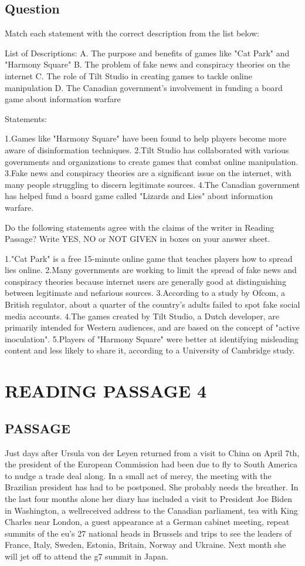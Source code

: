 \documentclass[10pt, a4paper, oneside]{article}
\begin{document}
\begin{spacing}{2.0}
\subsection{Question}
Match each statement with the correct description from the list below:

List of Descriptions:
A. The purpose and benefits of games like "Cat Park" and "Harmony Square"
B. The problem of fake news and conspiracy theories on the internet
C. The role of Tilt Studio in creating games to tackle online manipulation
D. The Canadian government's involvement in funding a board game about information warfare

Statements:

1.Games like "Harmony Square" have been found to help players become more aware of disinformation techniques.
2.Tilt Studio has collaborated with various governments and organizations to create games that combat online manipulation.
3.Fake news and conspiracy theories are a significant issue on the internet, with many people struggling to discern legitimate sources.
4.The Canadian government has helped fund a board game called "Lizards and Lies" about information warfare.

Do the following statements agree with the claims of the writer in Reading Passage? Write YES, NO or NOT GIVEN in boxes on your answer sheet.

1."Cat Park" is a free 15-minute online game that teaches players how to spread lies online.
2.Many governments are working to limit the spread of fake news and conspiracy theories because internet users are generally good at distinguishing between legitimate and nefarious sources.
3.According to a study by Ofcom, a British regulator, about a quarter of the country's adults failed to spot fake social media accounts.
4.The games created by Tilt Studio, a Dutch developer, are primarily intended for Western audiences, and are based on the concept of "active inoculation".
5.Players of "Harmony Square" were better at identifying misleading content and less likely to share it, according to a University of Cambridge study.

\section{READING PASSAGE 4}
\subsection{PASSAGE}
Just days after Ursula von der Leyen returned from a visit to China on April 7th, the president of the
European Commission had been due to fly to South America to nudge a trade deal along. In a small act of
mercy, the meeting with the Brazilian president has had to be postponed. She probably needs the breather.
In the last four months alone her diary has included a visit to President Joe Biden in Washington, a wellreceived 
address to the Canadian parliament, tea with King Charles near London, a guest appearance at a German cabinet meeting, 
repeat summits of the eu's 27 national heads in Brussels and trips to see the
leaders of France, Italy, Sweden, Estonia, Britain, Norway and Ukraine. Next month she will jet off to attend the g7 summit in Japan.


\end{spacing}
\end{document}
